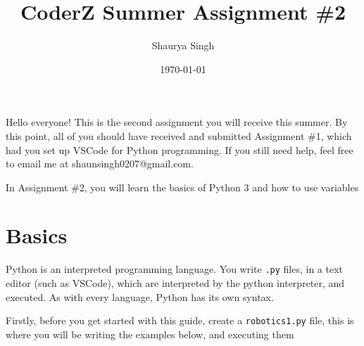 \documentclass{scrartcl}
\author{Shaurya Singh}
\date{\today}
\title{CoderZ Summer Assignment \#2}
\begin{document}
\maketitle
\setcounter{tocdepth}{2}
\tableofcontents

Hello everyone! This is the second assignment you will receive this summer. By this
point, all of you should have received and submitted Assignment \#1, which had
you set up VSCode for Python programming. If you still need help, feel free to
email me at shaunsingh0207@gmail.com.

In Assignment \#2, you will learn the basics of Python 3 and how to use variables

\section{Basics}
\label{sec:orge72a43f}
Python is an interpreted programming language. You write \texttt{.py} files, in a text
editor (such as VSCode), which are interpreted by the python interpreter, and
executed. As with every language, Python has its own syntax.

Firstly, before you get started with this guide, create a \texttt{robotics1.py} file,
this is where you will be writing the examples below, and executing them
\end{document}
